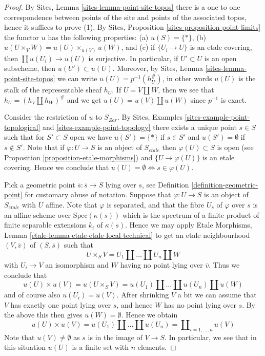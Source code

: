 \begin{proof}
By
Sites, Lemma \ref{sites-lemma-point-site-topos}
there is a one to one correspondence between points of the site and points
of the associated topos, hence it suffices to prove (1).
By
Sites, Proposition \ref{sites-proposition-point-limits}
the functor $u$ has the following properties:
(a) $u(S) = \{*\}$, (b) $u(U \times_V W) = u(U) \times_{u(V)} u(W)$, and
(c) if $\{U_i \to U\}$ is an etale covering, then
$\coprod u(U_i) \to u(U)$ is surjective.
In particular, if $U' \subset U$ is an open subscheme,
then $u(U') \subset u(U)$. Moreover, by
Sites, Lemma \ref{sites-lemma-point-site-topos}
we can write $u(U) = p^{-1}(h_U^\#)$, in other words $u(U)$ is the
stalk of the representable sheaf $h_U$. If
$U = V \amalg W$, then we see that $h_U = (h_V \amalg h_W)^\#$ and we get
$u(U) = u(V) \amalg u(W)$ since $p^{-1}$ is exact.

\medskip\noindent
Consider the restriction of $u$ to $S_{Zar}$. By
Sites, Examples \ref{sites-example-point-topological} and
\ref{sites-example-point-topology}
there exists a unique point $s \in S$ such that for $S' \subset S$ open we
have $u(S') = \{*\}$ if $s \in S'$ and $u(S') = \emptyset$ if $s \not \in S'$.
Note that if $\varphi : U \to S$ is an object of $S_{etale}$ then
$\varphi(U) \subset S$ is open (see
Proposition \ref{proposition-etale-morphisms})
and $\{U \to \varphi(U)\}$ is an etale covering. Hence we conclude that
$u(U) = \emptyset \Leftrightarrow s \in \varphi(U)$.

\medskip\noindent
Pick a geometric point $\overline{s} : \overline{s} \to S$ lying over $s$, see
Definition \ref{definition-geometric-point}
for customary abuse of notation. Suppose that $\varphi : U \to S$ is an object
of $S_{etale}$ with $U$ affine. Note that $\varphi$ is separated, and that
the fibre $U_s$ of $\varphi$ over $s$ is an affine scheme over
$\text{Spec}(\kappa(s))$ which is the spectrum of a finite product of
finite separable extensions $k_i$ of $\kappa(s)$. Hence we may apply
Etale Morphisms, Lemma \ref{etale-lemma-etale-etale-local-technical}
to get an etale neighbourhood $(V, \overline{v})$ of $(S, \overline{s})$
such that
$$
U \times_S V = U_1 \amalg \ldots \amalg U_n \amalg W
$$
with $U_i \to V$ an isomorphism and $W$ having no point lying over
$\overline{v}$. Thus we conclude that
$$
u(U) \times u(V) =
u(U \times_S V) =
u(U_1) \amalg \ldots \amalg u(U_n) \amalg u(W)
$$
and of course also $u(U_i) = u(V)$. After shrinking $V$ a bit we can
assume that $V$ has exactly one point lying over $s$, and hence $W$ has no
point lying over $s$. By the above this then gives $u(W) = \emptyset$.
Hence we obtain
$$
u(U) \times u(V) =
u(U_1) \amalg \ldots \amalg u(U_n) =
\coprod\nolimits_{i = 1, \ldots, n} u(V)
$$
Note that $u(V) \not = \emptyset$ as $s$ is in the image of $V \to S$.
In particular, we see that in this situation $u(U)$ is a finite
set with $n$ elements.


\end{proof}
